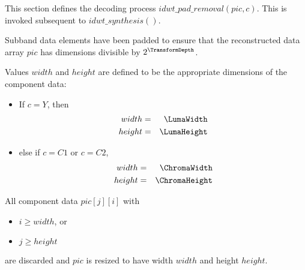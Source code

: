 This section defines the decoding process $idwt\_pad\_removal(pic, c)$. This
is invoked subsequent to $idwt\_synthesis()$.

Subband data elements have been padded to ensure that the reconstructed 
data array $pic$ has dimensions divisible by $2^\TransformDepth$.

Values $width$ and $height$ are defined to be the appropriate dimensions
of the component data:

\begin{itemize}
\item If $c=Y$, then
\begin{eqnarray*}
width & =& \LumaWidth \\
height & =& \LumaHeight
\end{eqnarray*}
\item else if $c=C1$ or $c=C2$,
\begin{eqnarray*}
width & =& \ChromaWidth \\
height & =& \ChromaHeight
\end{eqnarray*}
\end{itemize}

All component data $pic[j][i]$ with

\begin{itemize}
\item $i\geq width$, or
\item $j\geq height$
\end{itemize}

are discarded and $pic$ is resized to have width $width$ and height $height$.


